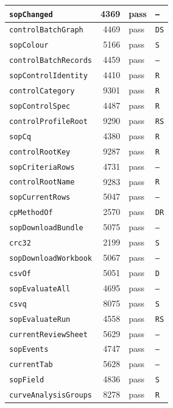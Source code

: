 {\begin{xltabular}{\linewidth}{|l|r|X|X|}
\texttt{sopChanged} & 4369 & pass & \texttt{--} \\ \hline
\texttt{controlBatchGraph} & 4469 & pass & \texttt{DS} \\ \hline
\texttt{sopColour} & 5166 & pass & \texttt{S} \\ \hline
\texttt{controlBatchRecords} & 4459 & pass & \texttt{--} \\ \hline
\texttt{sopControlIdentity} & 4410 & pass & \texttt{R} \\ \hline
\texttt{controlCategory} & 9301 & pass & \texttt{R} \\ \hline
\texttt{sopControlSpec} & 4487 & pass & \texttt{R} \\ \hline
\texttt{controlProfileRoot} & 9290 & pass & \texttt{RS} \\ \hline
\texttt{sopCq} & 4380 & pass & \texttt{R} \\ \hline
\texttt{controlRootKey} & 9287 & pass & \texttt{R} \\ \hline
\texttt{sopCriteriaRows} & 4731 & pass & \texttt{--} \\ \hline
\texttt{controlRootName} & 9283 & pass & \texttt{R} \\ \hline
\texttt{sopCurrentRows} & 5047 & pass & \texttt{--} \\ \hline
\texttt{cpMethodOf} & 2570 & pass & \texttt{DR} \\ \hline
\texttt{sopDownloadBundle} & 5075 & pass & \texttt{--} \\ \hline
\texttt{crc32} & 2199 & pass & \texttt{S} \\ \hline
\texttt{sopDownloadWorkbook} & 5067 & pass & \texttt{--} \\ \hline
\texttt{csvOf} & 5051 & pass & \texttt{D} \\ \hline
\texttt{sopEvaluateAll} & 4695 & pass & \texttt{--} \\ \hline
\texttt{csvq} & 8075 & pass & \texttt{S} \\ \hline
\texttt{sopEvaluateRun} & 4558 & pass & \texttt{RS} \\ \hline
\texttt{currentReviewSheet} & 5629 & pass & \texttt{--} \\ \hline
\texttt{sopEvents} & 4747 & pass & \texttt{--} \\ \hline
\texttt{currentTab} & 5628 & pass & \texttt{--} \\ \hline
\texttt{sopField} & 4836 & pass & \texttt{S} \\ \hline
\texttt{curveAnalysisGroups} & 8278 & pass & \texttt{R} \\ \hline

\end{xltabular}}

